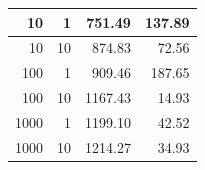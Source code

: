 \documentclass[12pt,a4paper,twoside,openright]{report}
\begin{document}
\begin{table}[H]
\begin{tabular}{|r|r|r|r|}
10                                                                                               & 1                                                                                           & 751.49                                                                                                                                       & 137.89                                                                                              \\ \hline
10                                                                                               & 10                                                                                          & 874.83                                                                                                                                       & 72.56                                                                                               \\ \hline
100                                                                                              & 1                                                                                           & 909.46                                                                                                                                       & 187.65                                                                                              \\ \hline
100                                                                                              & 10                                                                                          & 1167.43                                                                                                                                     & 14.93                                                                                               \\ \hline
1000                                                                                             & 1                                                                                           & 1199.10                                                                                                                                     & 42.52                                                                                               \\ \hline
1000                                                                                             & 10                                                                                          & 1214.27                                                                                                                                     & 34.93                                                                                               \\ \hline
\end{tabular}
\end{table}
\end{document}
